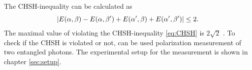 The CHSH-inequality can be calculated \cite{barz} as
\begin{equation}
\abs{E(\alpha,\beta)-E(\alpha,\beta')+E(\alpha',\beta)+E(\alpha',\beta')} \leq 2.
\label{eq:CHSH}
\end{equation}
The maximal value of violating the CHSH-inequality \eqref{eq:CHSH} is $2\sqrt{2}$ \cite{barz}.
To check  if the CHSH is violated or not, can be used polarization measurement of two entangled photons. 
The experimental setup for the measurement is shown in chapter \ref{sec:setup}. 








